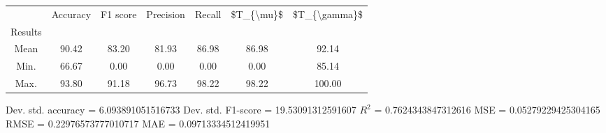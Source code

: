 \begin{tabular}{|c|c|c|c|c|c|c|}
\toprule
{} &  Accuracy &  F1 score &  Precision &  Recall &  \$T\_\{\textbackslash mu\}\$ &  \$T\_\{\textbackslash gamma\}\$ \\
Results &           &           &            &         &            &               \\
\hline
Mean    &     90.42 &     83.20 &      81.93 &   86.98 &      86.98 &         92.14 \\
Min.    &     66.67 &      0.00 &       0.00 &    0.00 &       0.00 &         85.14 \\
Max.    &     93.80 &     91.18 &      96.73 &   98.22 &      98.22 &        100.00 \\
\bottomrule
\end{tabular}

 Dev. std. accuracy = 6.093891051516733
 Dev. std. F1-score = 19.53091312591607
 $R^2$ = 0.7624343847312616
 MSE = 0.05279229425304165
 RMSE = 0.22976573777010717
 MAE = 0.09713334512419951